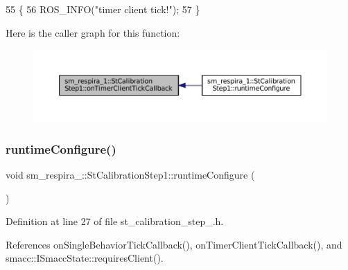 \begin{DoxyCode}
55     \{
56         ROS\_INFO(\textcolor{stringliteral}{"timer client tick!"});
57     \}
\end{DoxyCode}
Here is the caller graph for this function\+:
\nopagebreak
\begin{figure}[H]
\begin{center}
\leavevmode
\includegraphics[width=350pt]{structsm__respira__1_1_1StCalibrationStep1_a0076674470e3964b263531f3f41c73e6_icgraph}
\end{center}
\end{figure}
\mbox{\label{structsm__respira__1_1_1StCalibrationStep1_a041c623fb452bde3f3abd51eb5d9a7e6}} 
\subsubsection{\texorpdfstring{runtime\+Configure()}{runtimeConfigure()}}
{\footnotesize\ttfamily void sm\+\_\+respira\+\_\+::\+St\+Calibration\+Step1\+::runtime\+Configure (\begin{DoxyParamCaption}{ }\end{DoxyParamCaption})\hspace{0.3cm}{\ttfamily [inline]}}



Definition at line 27 of file st\+\_\+calibration\+\_\+step\+\_.\+h.



References on\+Single\+Behavior\+Tick\+Callback(), on\+Timer\+Client\+Tick\+Callback(), and smacc\+::\+I\+Smacc\+State\+::requires\+Client().



